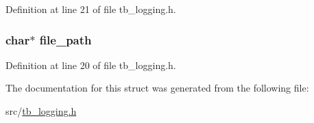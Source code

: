 Definition at line 21 of file tb\-\_\-logging.\-h.

\hypertarget{structtb__log__t_a19064fd51f3a2b4b3c6e8ac8c09850c2}{
\subsubsection[{file\-\_\-path}]{\setlength{\rightskip}{0pt plus 5cm}char$\ast$ file\-\_\-path}}\label{structtb__log__t_a19064fd51f3a2b4b3c6e8ac8c09850c2}


Definition at line 20 of file tb\-\_\-logging.\-h.



The documentation for this struct was generated from the following file\-:\begin{DoxyCompactItemize}
\item 
src/\hyperlink{tb__logging_8h}{tb\-\_\-logging.\-h}\end{DoxyCompactItemize}
